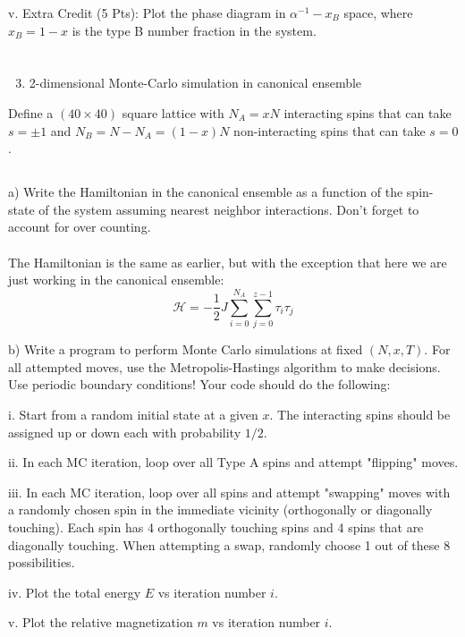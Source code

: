 \documentclass[12pt]{article}
\begin{document}
v. Extra Credit (5 Pts): Plot the phase diagram in $\alpha^{-1}-x_{B}$ space, where $x_{B}=1-x$ is the type B number fraction in the system.
\section{}
\begin{enumerate}
  \setcounter{enumi}{2}
  \item 2-dimensional Monte-Carlo simulation in canonical ensemble
\end{enumerate}

Define a $(40 \times 40)$ square lattice with $N_{A}=x N$ interacting spins that can take $s= \pm 1$ and $N_{B}=N-N_{A}=(1-x) N$ non-interacting spins that can take $s=0$.
\subsection{}
a) Write the Hamiltonian in the canonical ensemble as a function of the spin-state of the system assuming nearest neighbor interactions. Don't forget to account for over counting.\\\\
The Hamiltonian is the same as earlier, but with the exception that here we are just working in the canonical ensemble:
\begin{equation}
  \mathcal{H}=-\frac{1}{2}J \sum_{i=0}^{N_{A}} \sum_{j=0}^{z-1} \tau_{i} \tau_{j}
\end{equation}


b) Write a program to perform Monte Carlo simulations at fixed $(N, x, T)$. For all attempted moves, use the Metropolis-Hastings algorithm to make decisions. Use periodic boundary conditions! Your code should do the following:

i. Start from a random initial state at a given $x$. The interacting spins should be assigned up or down each with probability $1 / 2$.

ii. In each MC iteration, loop over all Type A spins and attempt "flipping" moves.

iii. In each MC iteration, loop over all spins and attempt "swapping" moves with a randomly chosen spin in the immediate vicinity (orthogonally or diagonally touching). Each spin has 4 orthogonally touching spins and 4 spins that are diagonally touching. When attempting a swap, randomly choose 1 out of these 8 possibilities.

iv. Plot the total energy $E$ vs iteration number $i$.

v. Plot the relative magnetization $m$ vs iteration number $i$.
\end{document}
